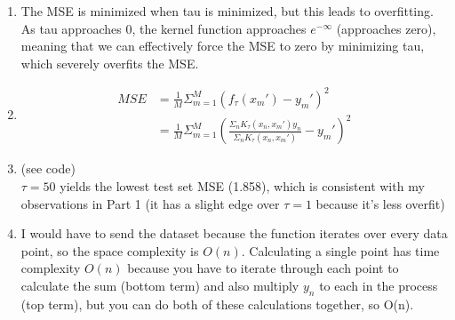 \documentclass[submit]{harvardml}
\begin{document}
\begin{solution}
\begin{enumerate}
  \item The MSE is minimized when tau is minimized, but this leads to overfitting. As tau approaches 0,
  the kernel function approaches $e^{-\infty}$ (approaches zero), meaning that we can effectively force the MSE to zero
  by minimizing tau, which severely overfits the MSE.
  \item
  \begin{align*}
    MSE &= \frac{1}{M}\Sigma_{m=1}^{M}(f_{\tau}(x_{m}')-y_{m}')^2\\
    &= \frac{1}{M}\Sigma_{m=1}^{M}(\frac{\Sigma_{n}K_{\tau}(x_n,x_{m}')y_n}{\Sigma_{n}K_{\tau}(x_n,x_{m}')}-y_{m}')^2
  \end{align*}
  \item (see code)\\
  $\tau=50$ yields the lowest test set MSE (1.858), which is consistent with
  my observations in Part 1 (it has a slight edge over $\tau=1$ because it's less
  overfit)
  \item I would have to send the dataset because the function iterates
  over every data point, so the space complexity is $O(n)$. Calculating
  a single point has time complexity $O(n)$ because you have to iterate through
  each point to calculate the sum (bottom term) and also multiply $y_n$ to each
  in the process (top term), but you can do both of these calculations together, so O(n).
\end{enumerate}

\end{solution}


\end{document}
